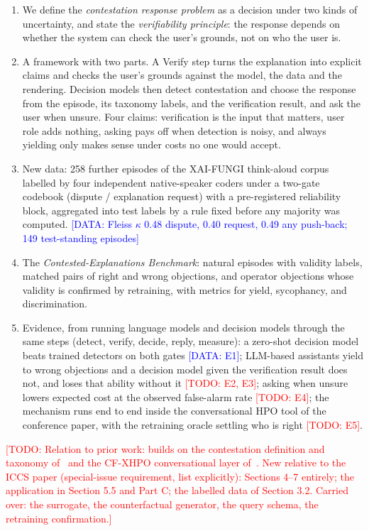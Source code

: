 \documentclass[preprint,12pt,3p,times]{elsarticle}
\newcommand{\todo}[1]{\textcolor{red}{[TODO: #1]}}
\newcommand{\done}[1]{\textcolor{blue}{[DATA: #1]}}   %
\begin{document}
\begin{enumerate}
  \item We define the \emph{contestation response problem} as a decision under two kinds of uncertainty, and state the \emph{verifiability principle}: the response depends on whether the system can check the user's grounds, not on who the user is.
  \item A framework with two parts. A Verify step turns the explanation into explicit claims and checks the user's grounds against the model, the data and the rendering. Decision models then detect contestation and choose the response from the episode, its taxonomy labels, and the verification result, and ask the user when unsure. Four claims: verification is the input that matters, user role adds nothing, asking pays off when detection is noisy, and always yielding only makes sense under costs no one would accept.
  \item New data: 258 further episodes of the XAI-FUNGI think-aloud corpus labelled by four independent native-speaker coders under a two-gate codebook (dispute / explanation request) with a pre-registered reliability block, aggregated into test labels by a rule fixed before any majority was computed. \done{Fleiss $\kappa$ 0.48 dispute, 0.40 request, 0.49 any push-back; 149 test-standing episodes}
  \item The \emph{Contested-Explanations Benchmark}: natural episodes with validity labels, matched pairs of right and wrong objections, and operator objections whose validity is confirmed by retraining, with metrics for yield, sycophancy, and discrimination.
  \item Evidence, from running language models and decision models through the same steps (detect, verify, decide, reply, measure): a zero-shot decision model beats trained detectors on both gates \done{E1}; LLM-based assistants yield to wrong objections and a decision model given the verification result does not, and loses that ability without it \todo{E2, E3}; asking when unsure lowers expected cost at the observed false-alarm rate \todo{E4}; the mechanism runs end to end inside the conversational HPO tool of the conference paper, with the retraining oracle settling who is right \todo{E5}.
\end{enumerate}
\todo{Relation to prior work: builds on the contestation definition and taxonomy of~\cite{phase1} and the CF-XHPO conversational layer of~\cite{manai2026orders}. New relative to the ICCS paper (special-issue requirement, list explicitly): Sections 4--7 entirely; the application in Section 5.5 and Part C; the labelled data of Section 3.2. Carried over: the surrogate, the counterfactual generator, the query schema, the retraining confirmation.}
\end{document}
